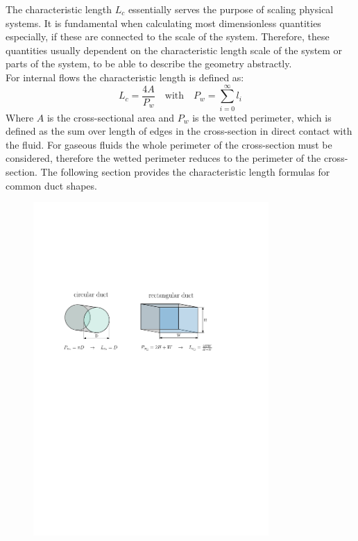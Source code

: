 The characteristic length $L_c$ essentially serves the purpose of scaling physical systems.
It is fundamental when calculating most dimensionless quantities especially, if these are connected to the scale of the system.
Therefore, these quantities usually dependent on the characteristic length scale of the system or parts of the system, to be able to describe the geometry abstractly.\\
For internal flows the characteristic length is defined as:
\begin{equation}
	L_c=\frac{4A}{P_w} \quad \text{with} \quad P_w = \sum^{\infty}_{i=0} l_i
\end{equation}
Where $A$ is the cross-sectional area and $P_w$ is the wetted perimeter, which is defined as the sum over length of edges in the cross-section in direct contact with the fluid.
For gaseous fluids the whole perimeter of the cross-section must be considered, therefore the wetted perimeter reduces to the perimeter of the cross-section.
The following section provides the characteristic length formulas for common duct shapes.
\cite{leishman_internal_2023}
\begin{figure}[H]
    \centering
    \includegraphics[width=0.8\textwidth]{src/02_foundations/fig_wetted-perimeter-nozzle-rect.pdf}
    \label{fig:wetted-rect-nozzle}
\end{figure}
